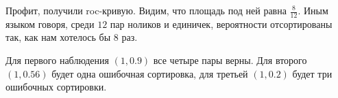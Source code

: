 \documentclass[12pt, a4paper, oneside]{article}
\begin{document}
{\begin{enumerate}
		Профит, получили roc-кривую.  Видим, что площадь под ней равна $\frac{8}{12}$. Иным языком говоря, среди $12$ пар ноликов и единичек, вероятности отсортированы так, как нам хотелось бы $8$ раз. 
		
		Для первого наблюдения $(1, 0.9)$ все четыре пары верны. Для второго $(1, 0.56)$ будет одна ошибочная сортировка, для третьей $(1,0.2)$ будет три ошибочных сортировки. 
	\end{enumerate}
	
}
\end{document}
